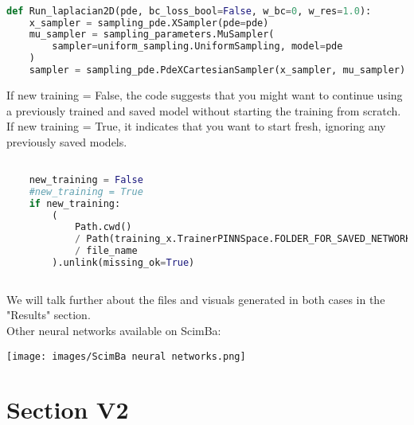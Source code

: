\documentclass[12pt]{article}
\begin{document}
\begin{lstlisting}[language=Python,caption={},frame=single, backgroundcolor=\color{gray!10}, basicstyle=\footnotesize,rulecolor=\color{blue}, framexleftmargin=3pt, commentstyle=\color{mygreen}, keywordstyle=\color{blue}]

def Run_laplacian2D(pde, bc_loss_bool=False, w_bc=0, w_res=1.0):
    x_sampler = sampling_pde.XSampler(pde=pde)
    mu_sampler = sampling_parameters.MuSampler(
        sampler=uniform_sampling.UniformSampling, model=pde
    )
    sampler = sampling_pde.PdeXCartesianSampler(x_sampler, mu_sampler)

\end{lstlisting}
\newpage
If new training = False, the code suggests that you might want to continue using a previously trained and saved model without starting the training from scratch.
If new training = True, it indicates that you want to start fresh, ignoring any previously saved models.
\begin{lstlisting}[language=Python,caption={},frame=single, backgroundcolor=\color{gray!10}, basicstyle=\footnotesize,rulecolor=\color{blue}, framexleftmargin=3pt, commentstyle=\color{mygreen}, keywordstyle=\color{blue}]

    new_training = False
    #new_training = True
    if new_training:
        (
            Path.cwd()
            / Path(training_x.TrainerPINNSpace.FOLDER_FOR_SAVED_NETWORKS)
            / file_name
        ).unlink(missing_ok=True)
        
\end{lstlisting}

We will talk further about the files and visuals generated in both cases in the "Results" section.
\\
Other neural networks available on ScimBa:
\begin{frame}{}
    \begin{center}
        \texttt{[image: images/ScimBa neural networks.png]}
    \end{center}
\end{frame}



\newpage

\section{Section V2}
\label{sec:Section V2}
\end{document}

